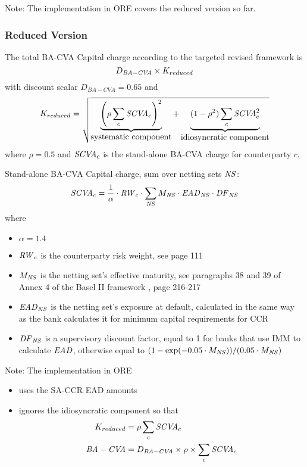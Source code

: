 Note: The implementation in ORE covers the reduced version so far.

\subsubsection{Reduced Version}\label{sssec_bacva_reduced}

The total BA-CVA Capital charge according to the targeted revised framework \cite{d507} is 
$$
D_{\mathit{BA-CVA}} \times K_{reduced}
$$
with discount scalar $D_{BA-CVA} = 0.65$ and
$$
K_{reduced} = \sqrt{\underbrace{\left(\rho\sum_c \mathit{SCVA}_c\right)^2}_{\mbox{systematic component}} + \underbrace{(1-\rho^2)\sum_c \mathit{SCVA}_c^2}_{\mbox{idiosyncratic component}}}
$$
where $\rho=0.5$ and $\mathit{SCVA}_c$ is the stand-alone BA-CVA charge for counterparty $c$.

\medskip\noindent
Stand-alone BA-CVA Capital charge, sum over netting sets $\mathit{NS}$:
$$
\mathit{SCVA}_c=\frac{1}{\alpha} \cdot \mathit{RW}_c \cdot \sum_{\mathit{NS}} M_{\mathit{NS}}\cdot \mathit{EAD}_{\mathit{NS}}\cdot \mathit{DF}_{\mathit{NS}}
$$
where 
\begin{itemize}
\item $\alpha=1.4$
\item $\mathit{RW}_c$ is the counterparty risk weight, see \cite{d424} page 111
\item $M_{\mathit{NS}}$ is the netting set's effective maturity, see paragraphs 38 and 39 of Annex 4 of the Basel II framework \cite{bcbs118}, page 216-217 
\item $\mathit{EAD}_{\mathit{NS}}$ is the netting set's exposure at default, calculated in the same way as the bank calculates it for minimum capital requirements for CCR
\item $\mathit{DF}_{\mathit{NS}}$ is a supervisory discount factor, equal to 1 for banks that use IMM to calculate $\mathit{EAD}$, otherwise equal to $(1-\exp(-0.05\cdot M_{\mathit{NS}}))/(0.05\cdot M_{\mathit{NS}})$
\end{itemize}


\medskip\noindent
Note: The implementation in ORE
\begin{itemize}
\item uses the SA-CCR EAD amounts
\item ignores the idiosyncratic component so that 
\begin{align*}
K_{reduced} &= \rho\sum_c \mathit{SCVA}_c \\
\mathit{BA-CVA} &= D_{\mathit{BA-CVA}} \times \rho\times \sum_c \mathit{SCVA}_c 
\end{align*}
\end{itemize}

